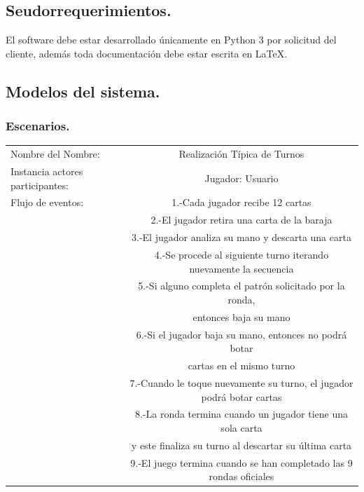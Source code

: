 \documentclass[60pt]{article}
\begin{document}
\subsection{Seudorrequerimientos.}\label{cap:seudorrequerimientos}
El software debe estar desarrollado únicamente en Python 3 por solicitud del cliente, además toda documentación debe estar escrita en LaTeX.
\subsection{Modelos del sistema.}\label{cap:modelos-sistema}

\subsubsection{Escenarios.}\label{cap:escenarios}

\begin{center}
    \begin{tabular}{ l | c  }
        Nombre del Nombre:            & Realización Típica de Turnos                                          \\
        Instancia actores participantes: & Jugador: Usuario                                                      \\\hline
        Flujo de eventos:                & 1.-Cada jugador recibe 12 cartas                                      \\
                                         & 2.-El jugador retira una carta de la   baraja                         \\
                                         & 3.-El jugador analiza su mano y descarta una carta                    \\
                                         & 4.-Se procede al siguiente turno iterando nuevamente la secuencia     \\
                                         & 5.-Si alguno completa el   patrón solicitado por la ronda,            \\
                                         & entonces baja su mano                                                 \\
                                         & 6.-Si el jugador baja su mano, entonces no podrá botar                \\
                                         & cartas en el mismo turno                                              \\
                                         & 7.-Cuando le toque nuevamente su turno, el jugador podrá botar cartas \\
                                         & 8.-La ronda termina cuando un jugador tiene una sola carta            \\
                                         & y este finaliza su turno al descartar su última carta                 \\
                                         & 9.-El juego termina cuando se han completado las 9 rondas oficiales   \\
        \hline
    \end{tabular}
\end{center}
\end{document}
